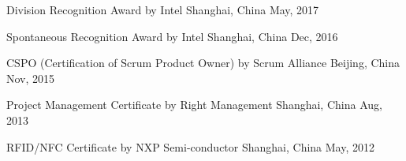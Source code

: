 



\begin{cvhonors}

  \cvhonor
    {Division Recognition Award } %
    {by Intel} %
    {Shanghai, China} %
    {May, 2017} %

  \cvhonor
    {Spontaneous Recognition Award } %
    {by Intel} %
    {Shanghai, China} %
    {Dec, 2016} %

  \cvhonor
    {CSPO (Certification of Scrum Product Owner) } %
    {by Scrum Alliance} %
    {Beijing, China} %
    {Nov, 2015} %

  \cvhonor
    {Project Management Certificate } %
    {by Right Management} %
    {Shanghai, China} %
    {Aug, 2013} %

  \cvhonor
    {RFID/NFC Certificate  } %
    {by NXP Semi-conductor} %
    {Shanghai, China} %
    {May, 2012} %
\end{cvhonors}







